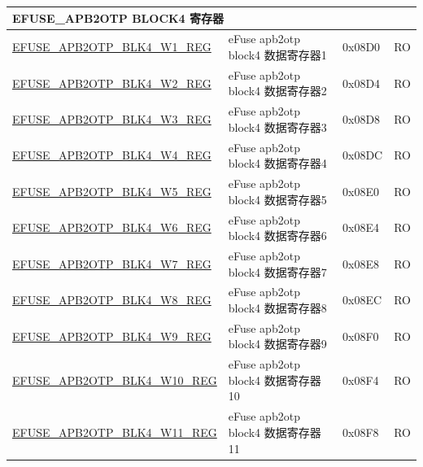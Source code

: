 \begin{longtable}{ | p{7cm} | p{6cm} | p{1.2cm} | p{1.5cm} | }
\multicolumn{4}{|l|}{\textbf{EFUSE\_APB2OTP BLOCK4 寄存器}} \\ \hline
\hyperref[regdesc:EFUSEAPB2OTPBLK4WNREG]{EFUSE\_APB2OTP\_BLK4\_W1\_REG} & eFuse apb2otp block4 数据寄存器1 & 0x08D0 & RO \\\hline
\hyperref[regdesc:EFUSEAPB2OTPBLK4WNREG]{EFUSE\_APB2OTP\_BLK4\_W2\_REG} & eFuse apb2otp block4 数据寄存器2 & 0x08D4 & RO \\\hline
\hyperref[regdesc:EFUSEAPB2OTPBLK4WNREG]{EFUSE\_APB2OTP\_BLK4\_W3\_REG} & eFuse apb2otp block4 数据寄存器3 & 0x08D8 & RO \\\hline
\hyperref[regdesc:EFUSEAPB2OTPBLK4WNREG]{EFUSE\_APB2OTP\_BLK4\_W4\_REG} & eFuse apb2otp block4 数据寄存器4 & 0x08DC & RO \\\hline
\hyperref[regdesc:EFUSEAPB2OTPBLK4WNREG]{EFUSE\_APB2OTP\_BLK4\_W5\_REG} & eFuse apb2otp block4 数据寄存器5 & 0x08E0 & RO \\\hline
\hyperref[regdesc:EFUSEAPB2OTPBLK4WNREG]{EFUSE\_APB2OTP\_BLK4\_W6\_REG} & eFuse apb2otp block4 数据寄存器6 & 0x08E4 & RO \\\hline
\hyperref[regdesc:EFUSEAPB2OTPBLK4WNREG]{EFUSE\_APB2OTP\_BLK4\_W7\_REG} & eFuse apb2otp block4 数据寄存器7 & 0x08E8 & RO \\\hline
\hyperref[regdesc:EFUSEAPB2OTPBLK4WNREG]{EFUSE\_APB2OTP\_BLK4\_W8\_REG} & eFuse apb2otp block4 数据寄存器8 & 0x08EC & RO \\\hline
\hyperref[regdesc:EFUSEAPB2OTPBLK4WNREG]{EFUSE\_APB2OTP\_BLK4\_W9\_REG} & eFuse apb2otp block4 数据寄存器9 & 0x08F0 & RO \\\hline
\hyperref[regdesc:EFUSEAPB2OTPBLK4WNREG]{EFUSE\_APB2OTP\_BLK4\_W10\_REG} & eFuse apb2otp block4 数据寄存器10 & 0x08F4 & RO \\\hline
\hyperref[regdesc:EFUSEAPB2OTPBLK4WNREG]{EFUSE\_APB2OTP\_BLK4\_W11\_REG} & eFuse apb2otp block4 数据寄存器11 & 0x08F8 & RO \\\hline


\end{longtable}
